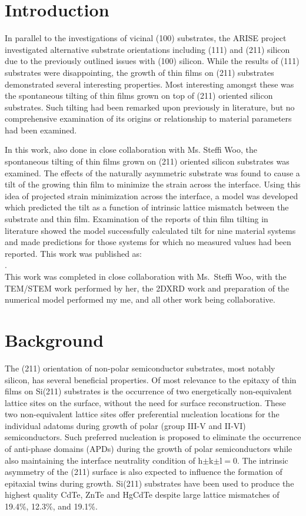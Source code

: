\section{Introduction}\label{sec:211}
In parallel to the investigations of vicinal (100) substrates, the ARISE project investigated alternative substrate orientations including (111) and (211) silicon due to the previously outlined issues with (100) silicon.
While the results of (111) substrates were disappointing, the growth of thin films on (211) substrates demonstrated several interesting properties.
Most interesting amongst these was the spontaneous tilting of thin films grown on top of (211) oriented silicon substrates.
Such tilting had been remarked upon previously in literature, but no comprehensive examination of its origins or relationship to material parameters had been examined.

In this work, also done in close collaboration with Ms. Steffi Woo, the spontaneous tilting of thin films grown on (211) oriented silicon substrates was examined.
The effects of the naturally asymmetric substrate was found to cause a tilt of the growing thin film to minimize the strain across the interface.
Using this idea of projected strain minimization across the interface, a model was developed which predicted the tilt as a function of intrinsic lattice mismatch between the substrate and thin film.
Examination of the reports of thin film tilting in literature showed the model successfully calculated tilt for nine material systems and made predictions for those systems for which no measured values had been reported.
This work was published as:\\
 \cite{Woo2013}.\\
This work was completed in close collaboration with Ms.~Steffi Woo, with the TEM/STEM work performed by her, the 2DXRD work and preparation of the numerical model performed my me, and all other work being collaborative.
\section{Background}
The (211) orientation of non-polar semiconductor substrates, most notably silicon, has several beneficial properties.
Of most relevance to the epitaxy of thin films on Si(211) substrates is the occurrence of two energetically non-equivalent lattice sites on the surface, without the need for surface reconstruction\cite{Wright1982}.
These two non-equivalent lattice sites offer preferential nucleation locations for the individual adatoms during growth of polar (group III-V and II-VI) semiconductors.
Such preferred nucleation is proposed to eliminate the occurrence of anti-phase domains (APDs) during the growth of polar semiconductors\cite{Wright1982} while also maintaining the interface neutrality condition of h\(\pm\)k\(\pm\)l\(=\)0\cite{Wright1982}.
The intrinsic asymmetry of the (211) surface is also expected to influence the formation of epitaxial twins during growth\cite{Devenyi2011}.
Si(211) substrates have been used to produce the highest quality CdTe\cite{Zhao2011}, ZnTe\cite{Wang2011a} and HgCdTe\cite{Dhar1997a} despite large lattice mismatches of 19.4\%, 12.3\%, and 19.1\%.

